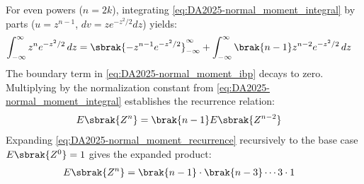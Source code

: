\begin{enumerate}[label=\thesubsection.\arabic*, ref=\thesubsection.\theenumi]
For even powers ($n = 2k$), integrating \eqref{eq:DA2025-normal_moment_integral} by parts ($u = z^{n-1}$, $dv = z e^{-z^2/2} dz$) yields:
\begin{align}
	\int_{-\infty}^{\infty} z^n e^{-z^2/2} \,dz &= \sbrak{-z^{n-1} e^{-z^2/2}}_{-\infty}^{\infty} + \int_{-\infty}^{\infty} \brak{n-1} z^{n-2} e^{-z^2/2} \,dz \label{eq:DA2025-normal_moment_ibp}
\end{align}
The boundary term in \eqref{eq:DA2025-normal_moment_ibp} decays to zero. Multiplying by the normalization constant from \eqref{eq:DA2025-normal_moment_integral} establishes the recurrence relation:
\begin{align}
	E\sbrak{Z^n} &= \brak{n-1} E\sbrak{Z^{n-2}} \label{eq:DA2025-normal_moment_recurrence}
\end{align}
Expanding \eqref{eq:DA2025-normal_moment_recurrence} recursively to the base case $E\sbrak{Z^0} = 1$ gives the expanded product:
\begin{align}
	E\sbrak{Z^n} &= \brak{n - 1} \cdot \brak{n - 3} \cdots 3 \cdot 1 \label{eq:DA2025-normal_moment_even}
\end{align}


\end{enumerate}

